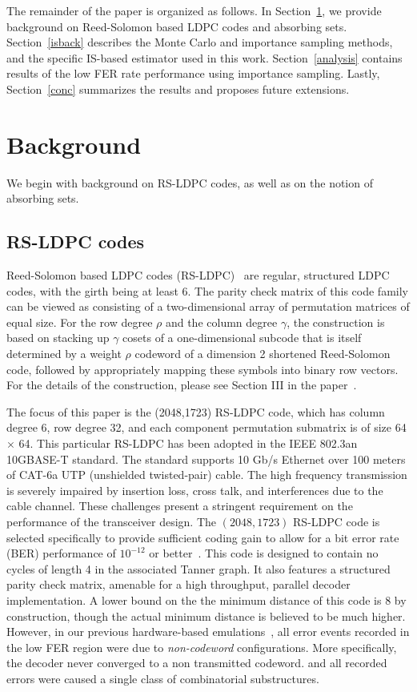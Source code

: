  The remainder of the paper is organized as follows. In
Section~\ref{ldpcback}, we provide background on Reed-Solomon based
LDPC codes and absorbing sets.  Section~\ref{isback} describes the
Monte Carlo and importance sampling methods, and the specific IS-based
estimator used in this work.  Section~\ref{analysis} contains results
of the low FER rate performance using importance sampling. Lastly,
Section~\ref{conc} summarizes the results and proposes future
extensions.

\section{Background}

\label{ldpcback}

We begin with background on RS-LDPC codes, as well as on the notion
of absorbing sets.


\subsection{RS-LDPC codes}
Reed-Solomon based LDPC codes (RS-LDPC)~\cite{rs-ldpc} are regular,
structured LDPC codes, with the girth being at least 6.  The parity
check matrix of this code family can be viewed as consisting of a
two-dimensional array of permutation matrices of equal size. For the
row degree $\rho$ and the column degree $\gamma$, the construction is
based on stacking up $\gamma$ cosets of a one-dimensional subcode that
is itself determined by a weight $\rho$ codeword of a dimension 2
shortened Reed-Solomon code, followed by appropriately mapping these
symbols into binary row vectors. For the details of the construction,
please see Section III in the paper~\cite{rs-ldpc}.

The focus of this paper is the (2048,1723) RS-LDPC code, which has
column degree 6, row degree 32, and each component permutation
submatrix is of size 64 $\times$ 64.  This particular RS-LDPC has been
adopted in the IEEE 802.3an 10GBASE-T standard. The standard supports
10 Gb/s Ethernet over 100 meters of CAT-6a UTP (unshielded
twisted-pair) cable. The high frequency transmission is severely
impaired by insertion loss, cross talk, and interferences due to the
cable channel. These challenges present a stringent requirement on the
performance of the transceiver design. The $(2048,1723)$ RS-LDPC code
is selected specifically to provide sufficient coding gain to allow
for a bit error rate (BER) performance of $10^{-12}$ or
better~\cite{802standard}.  This code is designed to contain no cycles
of length 4 in the associated Tanner graph. It also features a
structured parity check matrix, amenable for a high throughput,
parallel decoder implementation. A lower bound on the the minimum
distance of this code is 8 by construction, though the actual minimum
distance is believed to be much higher. However, in our previous
hardware-based emulations~\cite{zhang06}, all error events recorded in
the low FER region were due to \emph{non-codeword} configurations.
More specifically, the decoder never converged to a non transmitted
codeword.  and all recorded errors were caused a single class of
combinatorial substructures.




